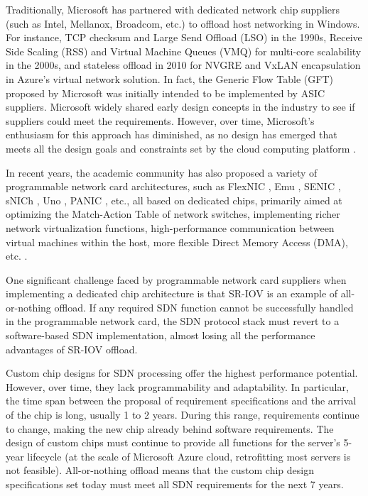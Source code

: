 Traditionally, Microsoft has partnered with dedicated network chip suppliers (such as Intel, Mellanox, Broadcom, etc.) to offload host networking in Windows. For instance, TCP checksum and Large Send Offload (LSO) in the 1990s, Receive Side Scaling (RSS) and Virtual Machine Queues (VMQ) for multi-core scalability in the 2000s, and stateless offload in 2010 for NVGRE and VxLAN encapsulation in Azure's virtual network solution. In fact, the Generic Flow Table (GFT) \cite{firestone2017vfp} proposed by Microsoft was initially intended to be implemented by ASIC suppliers. Microsoft widely shared early design concepts in the industry to see if suppliers could meet the requirements. However, over time, Microsoft's enthusiasm for this approach has diminished, as no design has emerged that meets all the design goals and constraints set by the cloud computing platform \cite{smartnic}.

In recent years, the academic community has also proposed a variety of programmable network card architectures, such as FlexNIC \cite{kaufmann2015flexnic,kaufmann2016high}, Emu \cite{sultana2017emu}, SENIC \cite{radhakrishnan2014senic}, sNICh \cite{ram2010snich}, Uno \cite{le2017uno}, PANIC \cite{stephens2018your}, etc., all based on dedicated chips, primarily aimed at optimizing the Match-Action Table of network switches, implementing richer network virtualization functions, high-performance communication between virtual machines within the host, more flexible Direct Memory Access (DMA), etc. \cite{kaufmann2015flexnic,kaufmann2016high}.

One significant challenge faced by programmable network card suppliers when implementing a dedicated chip architecture is that SR-IOV is an example of all-or-nothing offload. If any required SDN function cannot be successfully handled in the programmable network card, the SDN protocol stack must revert to a software-based SDN implementation, almost losing all the performance advantages of SR-IOV offload.

Custom chip designs for SDN processing offer the highest performance potential. However, over time, they lack programmability and adaptability. In particular, the time span between the proposal of requirement specifications and the arrival of the chip is long, usually 1 to 2 years. During this range, requirements continue to change, making the new chip already behind software requirements. The design of custom chips must continue to provide all functions for the server's 5-year lifecycle (at the scale of Microsoft Azure cloud, retrofitting most servers is not feasible). All-or-nothing offload means that the custom chip design specifications set today must meet all SDN requirements for the next 7 years.

